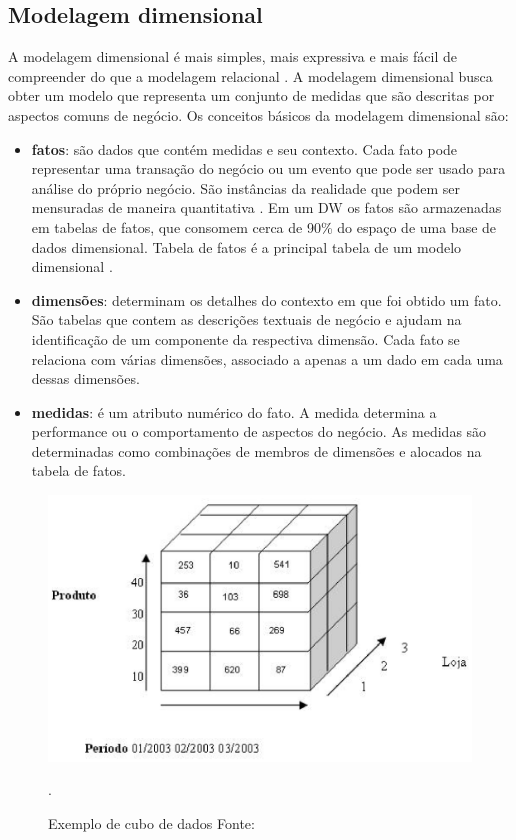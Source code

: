 \subsection{Modelagem dimensional}
\label{sec-dimensional-modeling}

%

A modelagem dimensional é mais simples, mais expressiva e mais fácil de compreender do que a modelagem relacional \cite{ballard1998}. A modelagem dimensional busca obter um modelo que representa um conjunto de medidas que são descritas por aspectos comuns de negócio.
%
Os conceitos básicos da modelagem dimensional são:

\begin{itemize}
	\item \textbf{fatos}: são dados que contém medidas e seu contexto. Cada fato pode representar uma transação do negócio ou um evento que pode ser usado para análise do próprio negócio. São instâncias da realidade  que podem ser mensuradas de maneira quantitativa \cite{kimball2002}. Em um DW os fatos são armazenadas em tabelas de fatos, que consomem cerca de 90\% do espaço de uma base de dados dimensional. Tabela de fatos é a principal tabela de um modelo dimensional \cite{kimball2002,ballard1998}.

	\item \textbf{dimensões}: determinam os detalhes do contexto em que foi obtido um fato. São tabelas que contem as descrições textuais de negócio e ajudam na identificação de um componente da respectiva dimensão. Cada fato se relaciona com várias dimensões, associado a apenas a um dado em cada uma dessas dimensões.

	\item \textbf{medidas}: é um atributo numérico do fato. A medida determina a performance ou o comportamento de aspectos do negócio. As medidas são determinadas como combinações de membros de dimensões e alocados na tabela de fatos.
\end{itemize}


 \begin{figure}[!htb]
 	\centering
 		\includegraphics[scale=0.8]{figuras/dw-cubo}
 		\caption{Exemplo de cubo de dados Fonte: \cite{Guimaraes2012}}.
 		\label{dw-cube}
 \end{figure}

